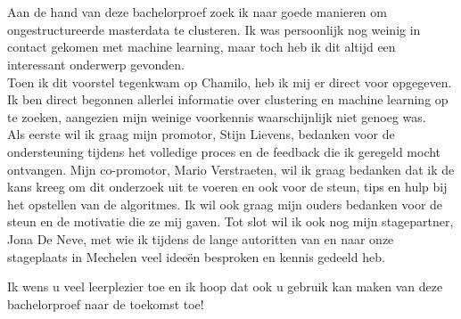 
\chapter*{}%
\label{ch:voorwoord}



Aan de hand van deze bachelorproef zoek ik naar goede manieren om ongestructureerde masterdata te clusteren. Ik was persoonlijk nog weinig in contact gekomen met machine learning, maar toch heb ik dit altijd een interessant onderwerp gevonden.
\\\indent
Toen ik dit voorstel tegenkwam op Chamilo, heb ik mij er direct voor opgegeven. Ik ben direct begonnen allerlei informatie over clustering en machine learning op te zoeken, aangezien mijn weinige voorkennis waarschijnlijk niet genoeg was.
\\\indent
Als eerste wil ik graag mijn promotor, Stijn Lievens, bedanken voor de ondersteuning tijdens het volledige proces en de feedback die ik geregeld mocht ontvangen.
Mijn co-promotor, Mario Verstraeten, wil ik graag bedanken dat ik de kans kreeg om dit onderzoek uit te voeren en ook voor de steun, tips en hulp bij het opstellen van de algoritmes. Ik wil ook graag mijn ouders bedanken voor de steun en de motivatie die ze mij gaven. Tot slot wil ik ook nog mijn stagepartner, Jona De Neve, met wie ik tijdens de lange autoritten van en naar onze stageplaats in Mechelen veel ideeën besproken en kennis gedeeld heb.


Ik wens u veel leerplezier toe en ik hoop dat ook u gebruik kan maken van deze bachelorproef naar de toekomst toe!

